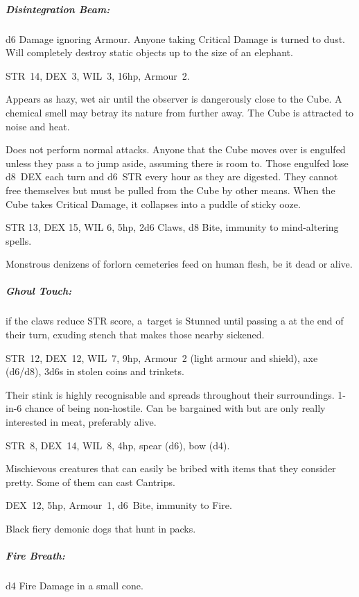 \documentclass[itdr]{subfiles}
\begin{document}
\subparagraph{Disintegration Beam:} d6 Damage ignoring \mbox{Armour}. Anyone taking Critical Damage is turned to dust. Will completely destroy static objects up to the size of an elephant.

\vfill

STR~14, DEX~3, WIL~3, 16hp, Armour~2.

Appears as hazy, wet air until the observer is dangerously close to the Cube. A chemical smell may betray its nature from further away. The Cube is
attracted to noise and heat.

Does not perform normal attacks. Anyone that the Cube moves over is engulfed unless they pass a  to jump aside, assuming there is room to. Those engulfed lose d8~DEX each turn and d6~STR every hour as they are digested. They cannot free themselves but must be pulled from the Cube by other means. When the Cube takes Critical Damage, it collapses into a puddle of sticky ooze.

\vfill

STR 13, DEX 15, WIL 6, 5hp, 2d6 Claws, d8 Bite, \mbox{immunity} to mind-altering spells.

Monstrous denizens of forlorn cemeteries feed on human flesh, be it dead or alive.

\subparagraph{Ghoul Touch:} if the claws reduce STR score, \mbox{a target} is Stunned until passing a  at the end of their turn, exuding stench that makes those nearby sickened.

\vfill

STR~12, DEX~12, WIL~7, 9hp, Armour~2 (light armour and shield), axe (d6/d8), 3d6s in stolen coins and trinkets.

Their stink is highly recognisable and spreads throughout their surroundings.
1-in-6 chance of being non-hostile. Can be bargained with but are only really interested in meat, preferably alive.

\vfill
\break

STR~8, DEX~14, WIL~8, 4hp, spear (d6), bow (d4).

Mischievous creatures that can easily be bribed with items that they consider pretty. Some of them can cast Cantrips.

\vfill

DEX~12, 5hp, Armour~1, d6~Bite, immunity to Fire.

Black fiery demonic dogs that hunt in packs.

\subparagraph{Fire Breath:} d4 Fire Damage in a small cone.
\end{document}
